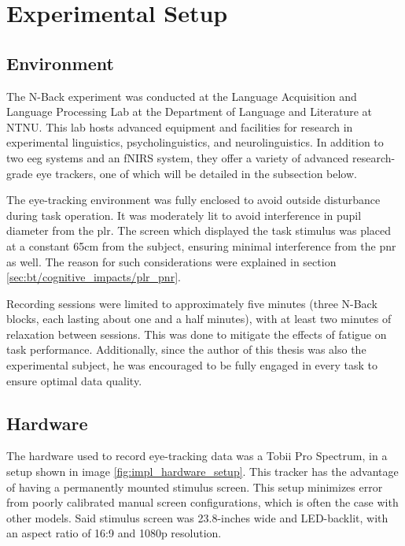 \section{Experimental Setup}

\subsection{Environment}

The N-Back experiment was conducted at the Language Acquisition and Language Processing Lab at the Department of Language and Literature at NTNU. This lab hosts advanced equipment and facilities for research in experimental linguistics, psycholinguistics, and neurolinguistics. In addition to two \acrshort{eeg} systems and an fNIRS system, they offer a variety of advanced research-grade eye trackers, one of which will be detailed in the subsection below. 

The eye-tracking environment was fully enclosed to avoid outside disturbance during task operation. It was moderately lit to avoid interference in pupil diameter from the \acrshort{plr}. The screen which displayed the task stimulus was placed at a constant 65cm from the subject, ensuring minimal interference from the \acrshort{pnr} as well. The reason for such considerations were explained in section \ref{sec:bt/cognitive_impacts/plr_pnr}. 

Recording sessions were limited to approximately five minutes (three N-Back blocks, each lasting about one and a half minutes), with at least two minutes of relaxation between sessions. This was done to mitigate the effects of fatigue on task performance. Additionally, since the author of this thesis was also the experimental subject, he was encouraged to be fully engaged in every task to ensure optimal data quality.

\subsection{Hardware}

The hardware used to record eye-tracking data was a Tobii Pro Spectrum, in a setup shown in image \ref{fig:impl_hardware_setup}. This tracker has the advantage of having a permanently mounted stimulus screen. This setup minimizes error from poorly calibrated manual screen configurations, which is often the case with other models. Said stimulus screen was 23.8-inches wide and LED-backlit, with an aspect ratio of 16:9 and 1080p resolution.

